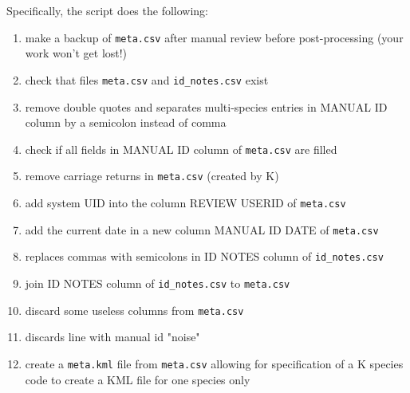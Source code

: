 \documentclass[English, 11pt, twoside, authoryear]{article}
\begin{document}
Specifically, the script does the following:
\begin{enumerate}
\item make a backup of \texttt{meta.csv} after manual review before post-processing (your work won't get lost!)
\item check that files \texttt{meta.csv} and \texttt{id\_notes.csv} exist
\item remove double quotes and separates multi-species entries in MANUAL ID column by a semicolon instead of comma
\item check if all fields in MANUAL ID column of \texttt{meta.csv} are filled
\item remove carriage returns in \texttt{meta.csv} (created by \textsf{K})
\item add system UID into the column REVIEW USERID of \texttt{meta.csv}
\item add the current date in a new column MANUAL ID DATE of \texttt{meta.csv}
\item replaces commas with semicolons in ID NOTES column of \texttt{id\_notes.csv}
\item join ID NOTES column of \texttt{id\_notes.csv} to \texttt{meta.csv}
\item discard some useless columns from \texttt{meta.csv}
\item discards line with manual id "noise"
\item create a \texttt{meta.kml} file from \texttt{meta.csv} allowing for specification of a \textsf{K} species code to create a KML file for one species only
\end{enumerate}
\end{document}
